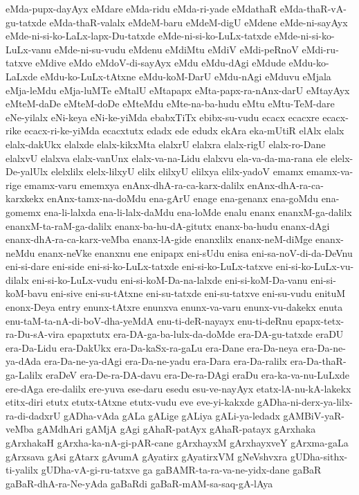 {eMda-pupx-dayAyx
eMdare
eMda-ridu
eMda-ri-yade
eMdathaR
eMda-thaR-vA-gu-tatxde
eMda-thaR-valalx
eMdeM-baru
eMdeM-digU
eMdene
eMde-ni-sayAyx
eMde-ni-si-ko-LaLx-lapx-Du-tatxde
eMde-ni-si-ko-LuLx-tatxde
eMde-ni-si-ko-LuLx-vanu
eMde-ni-su-vudu
eMdenu
eMdiMtu
eMdiV
eMdi-peRnoV
eMdi-ru-tatxve
eMdive
eMdo
eMdoV-di-sayAyx
eMdu
eMdu-dAgi
eMdude
eMdu-ko-LaLxde
eMdu-ko-LuLx-tAtxne
eMdu-koM-DarU
eMdu-nAgi
eMduvu
eMjala
eMja-leMdu
eMja-luMTe
eMtalU
eMtapapx
eMta-papx-ra-nAnx-darU
eMtayAyx
eMteM-daDe
eMteM-doDe
eMteMdu
eMte-na-ba-hudu
eMtu
eMtu-TeM-dare
eNe-yilalx
eNi-keya
eNi-ke-yiMda
ebabxTiTx
ebibx-su-vudu
ecacx
ecacxre
ecacx-rike
ecacx-ri-ke-yiMda
ecacxtutx
edadx
ede
edudx
ekAra
eka-mUtiR
elAlx
elalx
elalx-dakUkx
elalxde
elalx-kikxMta
elalxrU
elalxra
elalx-rigU
elalx-ro-Dane
elalxvU
elalxva
elalx-vanUnx
elalx-va-na-Lidu
elalxvu
ela-va-da-ma-rana
ele
elelx-De-yalUlx
elelxlilx
elelx-lilxyU
elilx
elilxyU
elilxya
elilx-yadoV
emamx
emamx-va-rige
emamx-varu
ememxya
enAnx-dhA-ra-ca-karx-dalilx
enAnx-dhA-ra-ca-karxkekx
enAnx-tamx-na-doMdu
ena-gArU
enage
ena-genanx
ena-goMdu
ena-gomemx
ena-li-lalxda
ena-li-lalx-daMdu
ena-loMde
enalu
enanx
enanxM-ga-dalilx
enanxM-ta-raM-ga-dalilx
enanx-ba-hu-dA-gitutx
enanx-ba-hudu
enanx-dAgi
enanx-dhA-ra-ca-karx-veMba
enanx-lA-gide
enanxlilx
enanx-neM-diMge
enanx-neMdu
enanx-neVke
enanxnu
ene
enipapx
eni-sUdu
enisa
eni-sa-noV-di-da-DeVnu
eni-si-dare
eni-side
eni-si-ko-LuLx-tatxde
eni-si-ko-LuLx-tatxve
eni-si-ko-LuLx-vu-dilalx
eni-si-ko-LuLx-vudu
eni-si-koM-Da-na-lalxde
eni-si-koM-Da-vanu
eni-si-koM-bavu
eni-sive
eni-su-tAtxne
eni-su-tatxde
eni-su-tatxve
eni-su-vudu
enituM
enonx-Deya
entry
enunx-tAtxre
enunxva
enunx-va-varu
enunx-vu-dakekx
enuta
enu-taM-ta-nA-di-boV-dha-yeMdA
enu-ti-deR-nayayx
enu-ti-deRnu
epapx-tetx-ra-Du-sA-vira
epapxtutx
era-DA-ga-ba-lulx-da-doMde
era-DA-gu-tatxde
eraDU
era-Da-Lidu
era-DakUkx
era-Da-kaSx-ra-gaLu
era-Dane
era-Da-neya
era-Da-ne-ya-dAda
era-Da-ne-ya-dAgi
era-Da-ne-yadu
era-Dara
era-Da-ralilx
era-Da-thaR-ga-Lalilx
eraDeV
era-De-ra-DA-davu
era-De-ra-DAgi
eraDu
era-ka-va-nu-LuLxde
ere-dAga
ere-dalilx
ere-yuva
ese-daru
esedu
esu-ve-nayAyx
etatx-lA-nu-kA-lakekx
etitx-diri
etutx
etutx-tAtxne
etutx-vudu
eve
eve-yi-kakxde
gADha-ni-derx-ya-lilx-ra-di-dadxrU
gADha-vAda
gALa
gALige
gALiya
gALi-ya-ledadx
gAMBiV-yaR-veMba
gAMdhAri
gAMjA
gAgi
gAhaR-patAyx
gAhaR-patayx
gArxhaka
gArxhakaH
gArxha-ka-nA-gi-pAR-cane
gArxhayxM
gArxhayxveY
gArxma-gaLa
gArxsava
gAsi
gAtarx
gAvumA
gAyatirx
gAyatirxVM
gNeVshvxra
gUDha-sithx-ti-yalilx
gUDha-vA-gi-ru-tatxve
ga
gaBAMR-ta-ra-va-ne-yidx-dane
gaBaR
gaBaR-dhA-ra-Ne-yAda
gaBaRdi
gaBaR-mAM-sa-saq-gA-lAya
}
